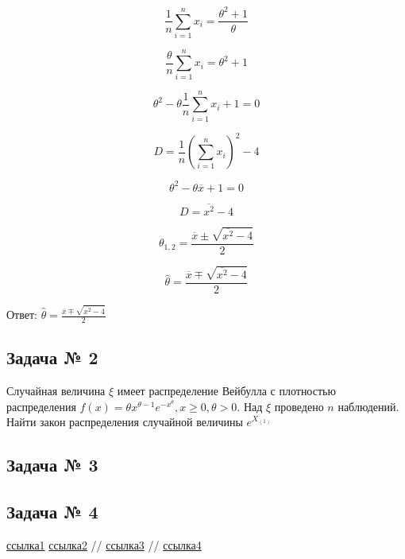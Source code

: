 \documentclass[a4paper,12pt, oneside]{book}
\begin{document}
$$
\frac{1}{n} \sum_{i=1}^{n} x_i =  \frac{\theta^2 + 1}{\theta}
$$

$$
\frac{\theta}{n} \sum_{i=1}^{n} x_i =  \theta^2 + 1
$$

$$
\theta^2 - \theta \frac{1}{n} \sum_{i=1}^{n} x_i +  1 = 0
$$

$$
D = \frac{1}{n} (\sum_{i=1}^{n} x_i)^2 - 4
$$

$$
\theta^2 - \theta \overline{x} + 1 = 0 
$$

$$
D = \overline{x^2} - 4
$$

$$
\theta_{1,2} = \frac{\overline{x} \pm \sqrt{\overline{x^2} -4}}{2}
$$

$$
\hat{\theta} = \frac{\overline{x} \mp \sqrt{\overline{x^2} - 4}}{2}
$$

Ответ: $ \hat{\theta} = \frac{\overline{x} \mp \sqrt{\overline{x^2} - 4}}{2}$


\begin{center}
	\chapter{Задача № 2}
\end{center}

Случайная величина $ \xi $ имеет распределение Вейбулла с плотностью распределения $f(x) = \theta x^{\theta - 1} e^{-x^{\theta}} , x \geq 0, \theta > 0.$ Над $ \xi $ проведено $ n $ наблюдений. Найти закон распределения случайной величины $ e^{X_{(1)}} $

\begin{center}
	\chapter{Задача № 3}
\end{center}

\begin{center}
	\chapter{Задача № 4}
\end{center}


\begin{thebibliography}{99}
	 \href{https://towardsdatascience.com/what-is-exponential-distribution-7bdd08590e2a}{ссылка1}
	  \href{https://www.statisticshowto.datasciencecentral.com/exponential-distribution/}{ссылка2}
	  // \href{http://www.ams.jhu.edu/~dan/550.435/notes/COURSENOTES435.pdf}{ссылка3}
	  // \href{http://www.obzh.ru/nad/4-3.html}{ссылка4}
\end{thebibliography}
\end{document}
